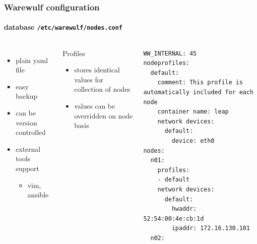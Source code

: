 \documentclass[aspectratio=169]{beamer}
\begin{document}
\begin{frame}[fragile]
\frametitle{Warewulf configuration}
\framesubtitle{database \texttt{/etc/warewulf/nodes.conf}}
\begin{columns}
\begin{itemize}
  \item plain yaml file
  \item easy backup
  \item can be version controlled
  \item external tools support
  \begin{itemize}
    \item vim, ansible
  \end{itemize}
\end{itemize}
\begin{block}{Profiles}
\begin{itemize}
  \item stores identical values for collection of nodes
  \item values can be overridden on node basis
\end{itemize}
\end{block}
\begin{lstlisting}[style=yaml]
WW_INTERNAL: 45
nodeprofiles:
  default:
    comment: This profile is automatically included for each node
    container name: leap
    network devices:
      default:
        device: eth0
nodes:
  n01:
    profiles:
    - default
    network devices:
      default:
        hwaddr: 52:54:00:4e:cb:1d
        ipaddr: 172.16.130.101
  n02:
\end{lstlisting}
%
\end{columns}
\end{frame}
\end{document}
